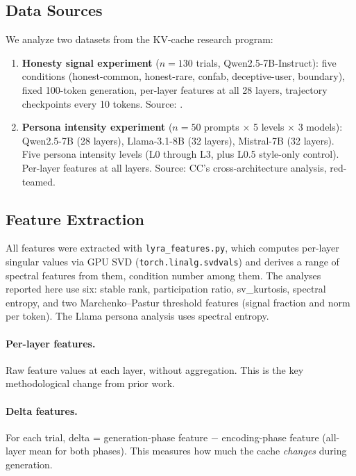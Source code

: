 \documentclass[11pt,a4paper]{article}
\begin{document}
\subsection{Data Sources}

We analyze two datasets from the KV-cache research program:

\begin{enumerate}
\item \textbf{Honesty signal experiment} ($n = 130$ trials,
  Qwen2.5-7B-Instruct): five conditions (honest-common, honest-rare,
  confab, deceptive-user, boundary), fixed 100-token generation,
  per-layer features at all 28 layers, trajectory checkpoints every 10
  tokens. Source: \citet{lyra_spectral}.

\item \textbf{Persona intensity experiment} ($n = 50$ prompts $\times$
  5 levels $\times$ 3 models): Qwen2.5-7B (28 layers),
  Llama-3.1-8B (32 layers), Mistral-7B (32 layers). Five persona
  intensity levels (L0 through L3, plus L0.5 style-only control).
  Per-layer features at all layers. Source: CC's cross-architecture
  analysis, red-teamed.
\end{enumerate}

\subsection{Feature Extraction}

All features were extracted with \texttt{lyra\_features.py}, which
computes per-layer singular values via GPU SVD
(\texttt{torch.linalg.svdvals}) and derives a range of spectral
features from them, condition number among them. The analyses reported
here use six: stable rank, participation ratio, sv\_kurtosis, spectral
entropy, and two Marchenko--Pastur threshold features (signal fraction
and norm per token). The Llama persona analysis uses spectral entropy.

\paragraph{Per-layer features.} Raw feature values at each layer,
without aggregation. This is the key methodological change from prior
work.

\paragraph{Delta features.} For each trial, delta = generation-phase
feature $-$ encoding-phase feature (all-layer mean for both phases).
This measures how much the cache \emph{changes} during generation.
\end{document}
